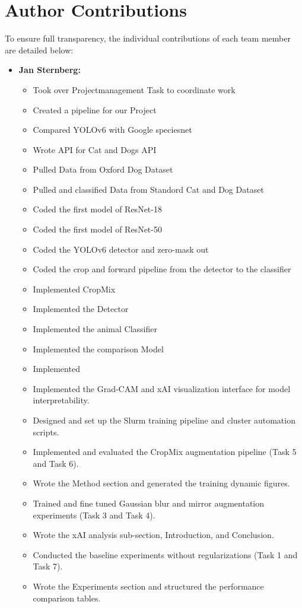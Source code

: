 \section{Author Contributions}
\label{sec:contributions}

To ensure full transparency, the individual contributions of each team member are detailed below:

\begin{itemize}
    \item \textbf{Jan Sternberg:} 
    \begin{itemize}
        \item Took over Projectmanagement Task to coordinate work
        \item Created a pipeline for our Project
        \item Compared YOLOv6 with Google speciesnet
        \item Wrote API for Cat and Dogs API
        \item Pulled Data from Oxford Dog Dataset
        \item Pulled and classified Data from Standord Cat and Dog Dataset
        \item Coded the first model of ResNet-18
        \item Coded the first model of ResNet-50
        \item Coded the YOLOv6 detector and zero-mask out
        \item Coded the crop and forward pipeline from the detector to the classifier
        \item Implemented CropMix
        \item Implemented the Detector
        \item Implemented the animal Classifier
        \item Implemented the comparison Model
        \item Implemented
        \item Implemented the Grad-CAM and xAI visualization interface for model interpretability.
        \item Designed and set up the Slurm training pipeline and cluster automation scripts.
        \item Implemented and evaluated the CropMix augmentation pipeline (Task 5 and Task 6).
        \item Wrote the Method section and generated the training dynamic figures.
        \item Trained and fine tuned Gaussian blur and mirror augmentation experiments (Task 3 and Task 4).
        \item Wrote the xAI analysis sub-section, Introduction, and Conclusion.
        \item Conducted the baseline experiments without regularizations (Task 1 and Task 7).
        \item Wrote the Experiments section and structured the performance comparison tables.
    \end{itemize}
    

\end{itemize}
